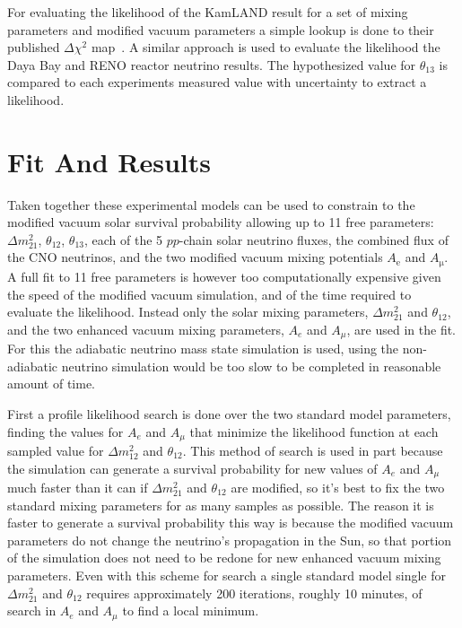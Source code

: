 For evaluating the likelihood of the KamLAND result for a set of
mixing parameters and modified vacuum parameters a simple lookup
is done to their published $\Delta \chi^{2}$ map~\cite{kamland_data_release}.
A similar approach is used to evaluate the likelihood the Daya Bay and
RENO reactor neutrino results. 
The hypothesized value for $\theta_{13}$ is compared to each
experiments measured value with uncertainty to extract a likelihood.


\section{Fit And Results}
Taken together these experimental models can be used to constrain
to the modified vacuum solar survival probability allowing up to
11 free parameters: $\Delta m^{2}_{21}$, $\theta_{12}$, $\theta_{13}$,
each of the 5 $pp$-chain solar neutrino fluxes, the combined flux of the
CNO neutrinos, and the two modified vacuum mixing potentials $A_{\mathrm{e}}$
and $A_{\mathrm{\mu}}$.
A full fit to 11 free parameters is however too computationally
expensive given the speed of the modified vacuum simulation, and
of the time required to evaluate the likelihood.
Instead only the solar mixing parameters, $\Delta m^2_{21}$ and $\theta_{12}$,
and the two enhanced vacuum mixing parameters, $A_{e}$ and $A_{\mu}$, are
used in the fit. For this the adiabatic neutrino mass state simulation is used,
using the non-adiabatic neutrino simulation would be too slow to be completed
in reasonable amount of time.

First a profile likelihood search is done over the two standard model parameters,
finding the values for $A_{e}$ and $A_{\mu}$ that minimize the likelihood
function at each sampled value for $\Delta m^{2}_{12}$ and $\theta_{12}$.
This method of search is used in part because the simulation can generate
a survival probability for new values of $A_{e}$ and $A_{\mu}$ much
faster than it can if $\Delta m^{2}_{21}$ and $\theta_{12}$ are modified,
so it's best to fix the two standard mixing parameters for as many samples
as possible.
The reason it is faster to generate a survival probability this way is because
the modified vacuum parameters do not
change the neutrino's propagation in the Sun, so that portion of the simulation
does not need to be redone for new enhanced vacuum mixing parameters.
Even with this scheme for search a single standard model single for $\Delta m^{2}_{21}$ and
$\theta_{12}$ requires approximately 200 iterations, roughly 10 minutes, of search in $A_{e}$ and
$A_{\mu}$ to find a local minimum.

